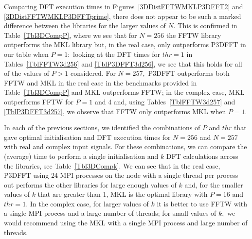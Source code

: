 \documentclass[a4paper]{article}
\begin{document}
 Comparing DFT execution times in Figures~\ref{3DDistFFTWMKLP3DFFT2}
 and \ref{3DDistFFTWMKLP3DFFTprime}, there does not appear to be such
 a marked difference between the libraries for the larger values of
 $N.$ This is confirmed in Table~\ref{Tbl3DCompP}, where we see that
 for $N=256$ the FFTW library outperforms the MKL library but, in the
 real case, only outperforms P3DFFT in our table when $P=1:$ looking
 at the DFT times for $thr=1$ in Tables~\ref{TblFFTW3d256} and
 \ref{TblP3DFFT3d256}, we see that this holds for all of the values
 of $P>1$ considered. For $N=257,$ P3DFFT outperforms both FFTW and
 MKL in the real case in the benchmarks provided in
 Table~\ref{Tbl3DCompP} and MKL outperforms FFTW; in the complex
 case, MKL outperforms FFTW for $P=1$ and 4 and, using
 Tables~\ref{TblFFTW3d257} and \ref{TblP3DFFT3d257}, we observe that
 FFTW only outperforms MKL when $P=1.$

 In each of the previous sections, we identified the combinations of
 $P$ and $thr$ that gave optimal initialisation and DFT execution
 times for $N=256$ and $N=257$ with real and complex input
 signals. For these combinations, we can compare the (average) time to
 perform a single initialisation and $k$ DFT calculations across the
 libraries, see Table~\ref{Tbl3DCompk}. We can see that in the real
 case, P3DFFT using 24 MPI processes on the node with a single thread
 per process out performs the other libraries for large enough values
 of $k$ and, for the smaller values of $k$ that are greater than 1,
 MKL is the optimal library with $P=16$ and $thr=1.$ In the complex
 case, for larger values of $k$ it is better to use FFTW with a single
 MPI process and a large number of threads; for small values of $k,$
 we would recommend using the MKL with a single MPI process and large
 number of threads. 
\end{document}
